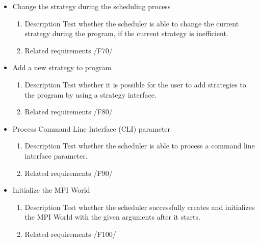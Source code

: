 {\begin{itemize}
\begin{enumerate}
\begin{itemize}
							\end{itemize}
							
						\item Related requirements\newline
 							  /F30/, /F40/, /F50/, /F60/		
				\end{enumerate}	
				
				
				\item Change the strategy during the scheduling process
				\begin{enumerate}
						\item Description\newline
Test whether the scheduler is able to change the current strategy during the program, if the current strategy is inefficient.
						\item Related requirements\newline
 							  /F70/		
				\end{enumerate}				
				
				\item Add a new strategy to program
				\begin{enumerate}
					\item Description\newline
Test whether it is possible for the user to add strategies to the program by using a strategy interface.
					\item Related requirements\newline
						/F80/
				\end{enumerate}
					
				
				\item Process Command Line Interface (CLI) parameter 		
					\begin{enumerate}
						\item Description\newline
Test whether the scheduler is able to process a command line interface parameter.
						\item Related requirements\newline
 							  /F90/		
				\end{enumerate}	
				
				\item Initialize the MPI World 
				\begin{enumerate}
						\item Description\newline
Test whether the scheduler successfully creates and initializes the MPI World with the given arguments after it starts.
						\item Related requirements\newline
 							  /F100/		
				\end{enumerate}




\end{itemize}}
